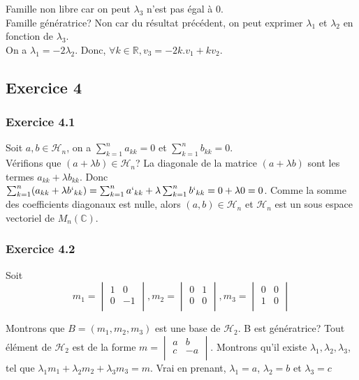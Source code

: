 \documentclass[]{book}
\theoremstyle{definition}
\newcommand{\bb}[1]{\mathbb{#1}}
\newcommand{\R}{\bb{R}}
\newcommand{\C}{\bb{C}}
\begin{document}
Famille non libre car on peut $\lambda_{3}$ n'est pas \'egal \`a 0.\\

Famille g\'en\'eratrice? Non car du r\'esultat pr\'ec\'edent, on peut exprimer $\lambda_1$ et $\lambda_2$ en fonction de $\lambda_3$.\\

On a $\lambda_1 = -2 \lambda_2$. Donc, $\forall k \in \R, v_3 = -2k.v_1 + kv_2$. 


\subsection*{Exercice 4}
\subsubsection*{Exercice 4.1}
Soit $a,b \in \mathscr{H}_n$, on a $\sum_{k=1}^{n}a_{kk} = 0$ et $\sum_{k=1}^{n}b_{kk} = 0$.\\

V\'erifions que $(a+\lambda b) \in \mathscr{H}_n$? La diagonale de la matrice $(a+\lambda b)$ sont les termes $a_{kk} + \lambda b_{kk}$. Donc $\sum_{k=1}^{n}(a_{kk} + \lambda b`_{kk}) = \sum_{k=1}^{n}a`_{kk} + \lambda \sum_{k=1}^{n}b`_{kk} = 0+ \lambda 0 = 0$. Comme la somme des coefficients diagonaux est nulle, alors $(a,b) \in \mathscr{H}_n$ et $\mathscr{H}_n$ est un sous espace vectoriel de $M_n(\C)$.\\


\subsubsection*{Exercice 4.2}
Soit 
$$m_1= 
\begin{vmatrix}
1 & 0   \\
0 & -1 \\
\end{vmatrix}
, m_2= 
\begin{vmatrix}
0 & 1 \\
0 & 0 \\
\end{vmatrix}
, m_3= 
\begin{vmatrix}
0 & 0 \\
1 & 0 \\
\end{vmatrix}
$$

Montrons que $B = (m_1, m_2 , m_3)$ est une base de $\mathscr{H}_2$.
B est g\'en\'eratrice? Tout \'el\'ement de $\mathscr{H}_2$ est de la forme $m = \begin{vmatrix}
a & b \\
c & -a \\
\end{vmatrix}
$.
Montrons qu'il existe $\lambda_1, \lambda_2, \lambda_3$, tel que $\lambda_1 m_1 + \lambda_2 m_2 + \lambda_3 m_3 = m$. Vrai en prenant, $\lambda_1 = a$, $\lambda_2 = b$ et $\lambda_3 = c$
\end{document}
